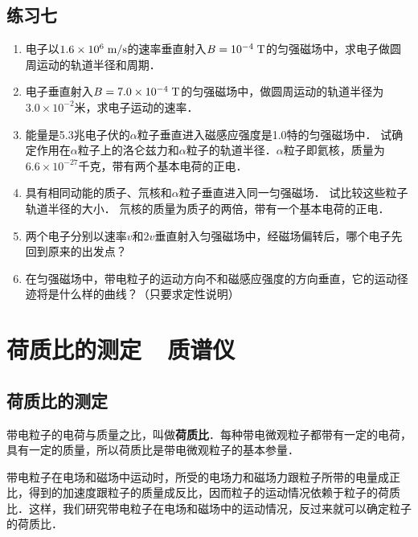 \subsection*{练习七}
\begin{enumerate}
    \item 电子以$1.6\times10^6\;\text{m}/\text{s}$的速率垂直射入$B=10^{-4} \;\text{T} $的匀强磁场中，求电子做圆周运动的轨道半径和周期．
    \item 电子垂直射入$B=7.0\times10^{-4} \;\text{T} $的匀强磁场中，做圆周运动的轨道半径为$3.0\times10^{-2}$米，求电子运动的速率．
    \item 能量是5.3兆电子伏的$\alpha$粒子垂直进入磁感应强度是1.0特的匀强磁场中．
    试确定作用在$\alpha$粒子上的洛仑兹力和$\alpha$粒子的轨道半径．$\alpha$粒子即氦核，质量为$6.6\times10^{-27}$千克，带有两个基本电荷的正电．
    \item 具有相同动能的质子、氘核和$\alpha$粒子垂直进入同一匀强磁场．
    试比较这些粒子轨道半径的大小．
    氘核的质量为质子的两倍，带有一个基本电荷的正电．
    \item 两个电子分别以速率$v$和$2v$垂直射入匀强磁场中，经磁场偏转后，哪个电子先回到原来的出发点？
    \item 在匀强磁场中，带电粒子的运动方向不和磁感应强度的方向垂直，它的运动径迹将是什么样的曲线？（只要求定性说明）
\end{enumerate}


\section{荷质比的测定~~质谱仪}
\subsection{荷质比的测定}

带电粒子的电荷与质量之比，叫做\textbf{荷质比}．每种带电微观粒子都带有一定的电荷，具有一定的质量，所以荷质比是带电微观粒子的基本参量．

带电粒子在电场和磁场中运动时，所受的电场力和磁场力跟粒子所带的电量成正比，得到的加速度跟粒子的质量成反比，因而粒子的运动情况依赖于粒子的荷质比．这样，我们研究带电粒子在电场和磁场中的运动情况，反过来就可以确定粒子的荷质比．

